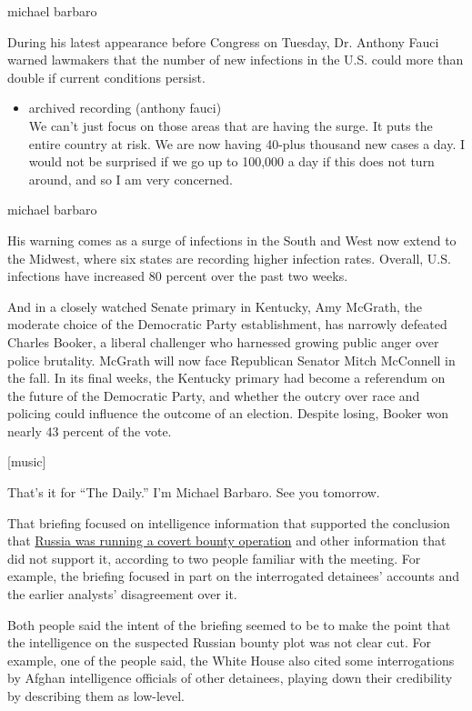 michael barbaro

During his latest appearance before Congress on Tuesday, Dr. Anthony
Fauci warned lawmakers that the number of new infections in the U.S.
could more than double if current conditions persist.

\begin{itemize}
\tightlist
\item
  archived recording (anthony fauci)\\
  We can't just focus on those areas that are having the surge. It puts
  the entire country at risk. We are now having 40-plus thousand new
  cases a day. I would not be surprised if we go up to 100,000 a day if
  this does not turn around, and so I am very concerned.
\end{itemize}

michael barbaro

His warning comes as a surge of infections in the South and West now
extend to the Midwest, where six states are recording higher infection
rates. Overall, U.S. infections have increased 80 percent over the past
two weeks.

And in a closely watched Senate primary in Kentucky, Amy McGrath, the
moderate choice of the Democratic Party establishment, has narrowly
defeated Charles Booker, a liberal challenger who harnessed growing
public anger over police brutality. McGrath will now face Republican
Senator Mitch McConnell in the fall. In its final weeks, the Kentucky
primary had become a referendum on the future of the Democratic Party,
and whether the outcry over race and policing could influence the
outcome of an election. Despite losing, Booker won nearly 43 percent of
the vote.

{[}music{]}

That's it for ``The Daily.'' I'm Michael Barbaro. See you tomorrow.

That briefing focused on intelligence information that supported the
conclusion that
\href{https://www.nytimes.com/2020/07/01/podcasts/the-daily/russian-bounties-afghanistan.html}{Russia
was running a covert bounty operation} and other information that did
not support it, according to two people familiar with the meeting. For
example, the briefing focused in part on the interrogated detainees'
accounts and the earlier analysts' disagreement over it.

Both people said the intent of the briefing seemed to be to make the
point that the intelligence on the suspected Russian bounty plot was not
clear cut. For example, one of the people said, the White House also
cited some interrogations by Afghan intelligence officials of other
detainees, playing down their credibility by describing them as
low-level.

